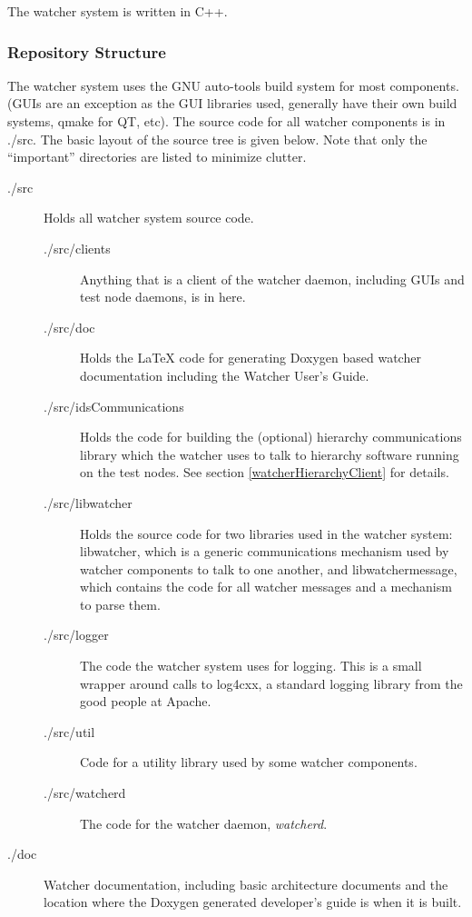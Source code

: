 \documentclass{article}
\begin{document}
The watcher system is written in C++. 

\subsubsection{Repository Structure}
The watcher system uses the GNU auto-tools build system for most components. (GUIs are an exception as the GUI libraries used, generally have 
their own build systems, qmake for QT, etc).  The source code for all watcher components is in .\slash src. The basic layout of the source tree is given
below. Note that only the ``important'' directories are listed to minimize clutter. 

\begin{description}
\item[.\slash src] Holds all watcher system source code. 
\begin{description}
\item[.\slash src\slash clients] Anything that is a client of the watcher daemon, including GUIs and test node daemons, is in here. 
\item[.\slash src\slash doc] Holds the \LaTeX{} code for generating Doxygen based watcher documentation including the Watcher User's Guide.
\item[.\slash src\slash idsCommunications] Holds the code for building the (optional) hierarchy communications library which the watcher uses to talk to hierarchy software running on the test nodes. 
See section \ref{watcherHierarchyClient} for details.
\item[.\slash src\slash libwatcher] Holds the source code for two libraries used in the watcher system: libwatcher, which is a generic communications mechanism used by watcher components
to talk to one another, and libwatchermessage, which contains the code for all watcher messages and a mechanism to parse them. 
\item[.\slash src\slash logger] The code the watcher system uses for logging. This is a small wrapper around calls to log4cxx, a standard logging library from the good people at Apache. 
\item[.\slash src\slash util] Code for a utility library used by some watcher components. 
\item[.\slash src\slash watcherd] The code for the watcher daemon, {\it watcherd}. 
\end{description}
\item[.\slash doc] Watcher documentation, including basic architecture documents and the location where the Doxygen generated developer's guide is when it is built. 

\end{description}
\end{document}
